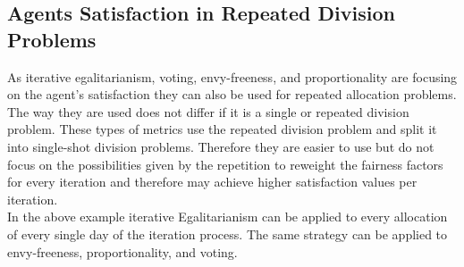 \documentclass[german, a4paper, 11pt, oneside]{scrbook}
\begin{document}
\subsection{Agents Satisfaction in Repeated Division Problems}
As iterative egalitarianism, voting, envy-freeness, and proportionality are focusing on the agent's satisfaction they can also be used for repeated allocation problems. The way they are used does not differ if it is a single or repeated division problem. These types of metrics use the repeated division problem and split it into single-shot division problems. Therefore they are easier to use but do not focus on the possibilities given by the repetition to reweight the fairness factors for every iteration and therefore may achieve higher satisfaction values per iteration.
\\In the above example iterative Egalitarianism can be applied to every allocation of every single day of the iteration process. The same strategy can be applied to envy-freeness, proportionality, and voting. 
\end{document}
